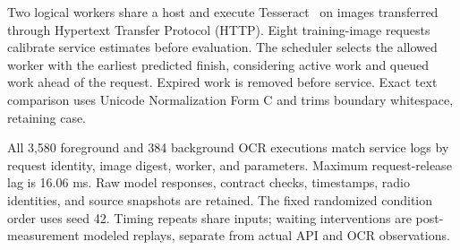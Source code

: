 Two logical workers share a host and execute Tesseract~\cite{smith2007overview} on images transferred through Hypertext Transfer Protocol (HTTP). Eight training-image requests calibrate service estimates before evaluation. The scheduler selects the allowed worker with the earliest predicted finish, considering active work and queued work ahead of the request. Expired work is removed before service. Exact text comparison uses Unicode Normalization Form C and trims boundary whitespace, retaining case.

All 3,580 foreground and 384 background OCR executions match service logs by request identity, image digest, worker, and parameters. Maximum request-release lag is 16.06 ms. Raw model responses, contract checks, timestamps, radio identities, and source snapshots are retained. The fixed randomized condition order uses seed 42. Timing repeats share inputs; waiting interventions are post-measurement modeled replays, separate from actual API and OCR observations.
